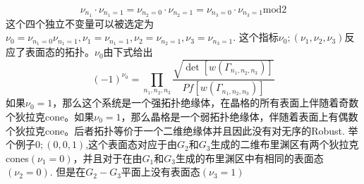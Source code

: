 \documentclass{article}
\numberwithin{equation}{subsection}
\begin{document}
\begin{equation}
    \nu_{n_1}\cdot\nu_{n_1=1}=\nu_{n_2=0}\cdot\nu_{n_2=1}=\nu_{n_3=0}\cdot\nu_{n_3=1}\mathrm{mod}2
\end{equation}
这个四个独立不变量可以被选定为$\nu_{0}=\nu_{n_1=0}\nu_{n_1=1},\nu_1=\nu_{n_1=1},\nu_2=\nu_{n_2=1},\nu_{3}=\nu_{n_3=1}$. 这个指标$\nu_0;(\nu_1,\nu_2,\nu_3)$反应了表面态的拓扑。$\nu_0$由下式给出
\begin{equation}
    (-1)^{\nu_0}=\prod_{n_1,n_2,n_3}\frac{\sqrt{\det[w(\Gamma_{n_1,n_2,n_3})]}}{Pf[w(\Gamma_{n_1,n_2,n_3})]}
\end{equation}
如果$\nu_0=1$，那么这个系统是一个强拓扑绝缘体，在晶格的所有表面上伴随着奇数个狄拉克cone。如果$\nu_0=1$，那么晶格是一个弱拓扑绝缘体，伴随着表面上有偶数个狄拉克cone。后者拓扑等价于一个二维绝缘体并且因此没有对无序的Robust. 举个例子$0;(0,0,1)$,这个表面态对应于由$G_2$和$G_3$生成的二维布里渊区有两个狄拉克cones$(\nu_1=0)$，并且对于在由$G_1$和$G_3$生成的布里渊区中有相同的表面态$(\nu_2=0)$. 但是在$G_2-G_3$平面上没有表面态$(\nu_3=1)$
\end{document}
